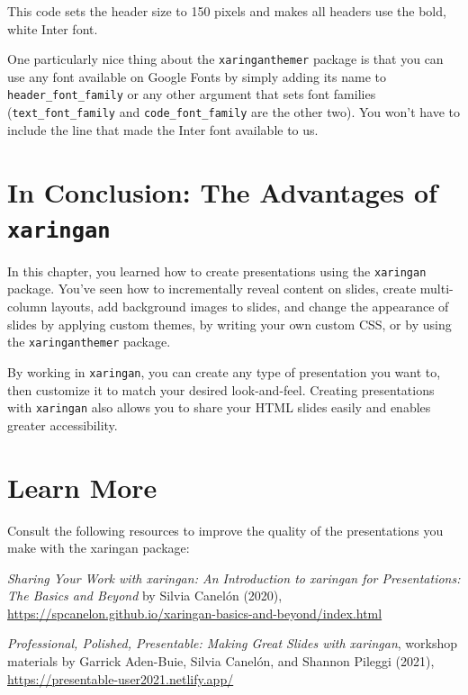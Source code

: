 \documentclass[
]{book}
\begin{document}
This code sets the header size to 150 pixels and makes all headers use the bold, white Inter font.

One particularly nice thing about the \texttt{xaringanthemer} package is that you can use any font available on Google Fonts by simply adding its name to \texttt{header\_font\_family} or any other argument that sets font families (\texttt{text\_font\_family} and \texttt{code\_font\_family} are the other two). You won't have to include the line that made the Inter font available to us.

\hypertarget{in-conclusion-the-advantages-of-xaringan}{%
\section*{\texorpdfstring{In Conclusion: The Advantages of \texttt{xaringan}}{In Conclusion: The Advantages of xaringan}}\label{in-conclusion-the-advantages-of-xaringan}}

In this chapter, you learned how to create presentations using the \texttt{xaringan} package. You've seen how to incrementally reveal content on slides, create multi-column layouts, add background images to slides, and change the appearance of slides by applying custom themes, by writing your own custom CSS, or by using the \texttt{xaringanthemer} package.

By working in \texttt{xaringan}, you can create any type of presentation you want to, then customize it to match your desired look-and-feel. Creating presentations with \texttt{xaringan} also allows you to share your HTML slides easily and enables greater accessibility.

\hypertarget{learn-more-7}{%
\section*{Learn More}\label{learn-more-7}}

Consult the following resources to improve the quality of the presentations you make with the xaringan package:

\emph{Sharing Your Work with xaringan: An Introduction to xaringan for Presentations: The Basics and Beyond} by Silvia Canelón (2020), \url{https://spcanelon.github.io/xaringan-basics-and-beyond/index.html}

\emph{Professional, Polished, Presentable: Making Great Slides with xaringan}, workshop materials by Garrick Aden-Buie, Silvia Canelón, and Shannon Pileggi (2021), \url{https://presentable-user2021.netlify.app/}
\end{document}
